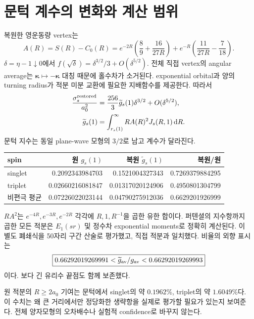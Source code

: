\documentclass[11pt,a4paper]{article}
\newcommand{\dd}{\mathrm d}\newcommand{\kb}{k_{\rm B}}\newcommand{\ev}{\epsilon_{\rm eV}}\newcommand{\eV}{\mathrm{eV}}\newcommand{\cm}{\mathrm{CM}}\newcommand{\lab}{\mathrm{lab}}
\numberwithin{equation}{section}
\begin{document}
\section{문턱 계수의 변화와 계산 범위}
복원한 영운동량 vertex는
\begin{equation}
A(R)=S(R)-C_0(R)
=e^{-2R}\left(\frac89+\frac{16}{27R}\right)
+e^{-R}\left(\frac{11}{27R}-\frac7{18}\right).
\end{equation}
$\delta=\eta-1\downarrow0$에서 $f(\sqrt\delta)=\delta^{3/2}/3+O(\delta^{5/2})$. 전체 직접 vertex의 angular average는 $\bm\kappa\mapsto-\bm\kappa$ 대칭 때문에 홀수차가 소거된다. exponential orbital과 양의 turning radius가 적분 미분 교환에 필요한 지배함수를 제공한다. 따라서
\begin{align}
\frac{\sigma_s^{\rm restored}}{a_0^2}
&=\frac{256}{3}\widetilde g_s(1)\delta^{3/2}+O(\delta^{5/2}),\\
\widetilde g_s(1)&=\int_{r_s(1)}^\infty R A(R)^2J_s(R,1)\,\dd R.
\end{align}
문턱 지수는 동일 plane-wave 모형의 $3/2$로 남고 계수가 달라진다.

\begin{center}\begin{tabular}{@{}lrrr@{}}\toprule
spin & 원 $g_s(1)$ & 복원 $\widetilde g_s(1)$ & 복원/원\\\midrule
singlet & 0.2092343984703 & 0.1521004327343 & 0.7269379884295\\
triplet & 0.02660216081847 & 0.01317020124906 & 0.4950801304799\\
비편극 평균 & 0.07226022023144 & 0.04790275912036 & 0.6629201926999\\\bottomrule
\end{tabular}\end{center}
$RA^2$는 $e^{-4R},e^{-3R},e^{-2R}$ 각각에 $R,1,R^{-1}$을 곱한 유한 합이다. 퍼텐셜의 지수항까지 곱한 모든 적분은 $E_1(sr)$ 및 정수차 exponential moments로 정확히 계산된다. 이 별도 폐쇄식을 50자리 구간 산술로 평가했고, 직접 적분과 일치했다. 비율의 외향 표시는
\begin{equation}
\boxed{0.66292019269991<\widetilde g_{\rm av}/g_{\rm av}<0.66292019269993}
\end{equation}
이다. 보다 긴 유리수 끝점도 함께 보존했다.

원 적분의 $R\ge2a_0$ 기여는 문턱에서 singlet의 약 $0.1962\%$, triplet의 약 $1.6049\%$다. 이 수치는 왜 큰 거리에서만 정당화한 생략항을 실제로 평가할 필요가 있는지 보여준다. 전체 양자모형의 오차배수나 실험적 confidence로 바꾸지 않는다.
\end{document}
